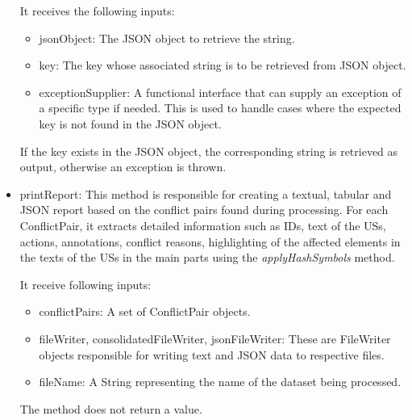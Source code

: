 \begin{itemize}
	It receives the following inputs:
	\begin{itemize}
		\item jsonObject: The JSON object to retrieve the string.
		
		\item key: The key whose associated string is to be retrieved from JSON object.
		
		\item exceptionSupplier: A functional interface that can supply an exception of a specific type if needed. This is used to handle cases where the expected key is not found in the JSON object.
		
	\end{itemize}
	If the key exists in the JSON object, the corresponding string is retrieved as output, otherwise an exception is thrown.
	
	\item printReport: This method is responsible for creating a textual, tabular and JSON report based on the conflict pairs found during processing. For each ConflictPair, it extracts detailed information such as IDs, text of the USs, actions, annotations, conflict reasons, highlighting of the affected elements in the texts of the USs in the main parts using the \textit{applyHashSymbols} method. 
	
	It receive following inputs: 
	\begin{itemize}
		\item conflictPairs: A set of ConflictPair objects.
		
		\item fileWriter, consolidatedFileWriter, jsonFileWriter: These are FileWriter objects responsible for writing text and JSON data to respective files.
		
		\item fileName: A String representing the name of the dataset being processed.
	\end{itemize}
	The method does not return a value.
	\end{itemize}
	
